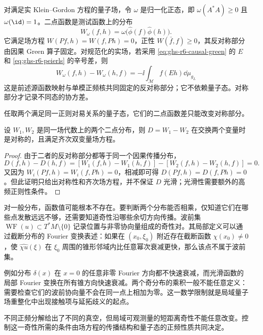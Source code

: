对满足实 Klein--Gordon 方程的量子场，令 $\omega$ 是归一化正态，即 $\omega(A^*A)\ge0$ 且 $\omega(\id)=1$。二点函数是测试函数上的分布
\begin{equation}\label{eq:ghs-r6-two-point-distribution}
W_\omega(f,h)=\omega\bigl(\widehat\phi(f)\widehat\phi(h)\bigr).
\end{equation}
它满足场方程 $W(Pf,h)=W(f,Ph)=0$，正性 $W(\bar f,f)\ge0$，其反对称部分由因果 Green 算子固定。对规范化的实场，若采用 \cref{eq:ghs-r6-causal-green} 的 $E$ 和 \cref{eq:ghs-r6-peierls} 的辛号差，则
\begin{equation}\label{eq:ghs-r6-w-antisymmetric}
W_\omega(f,h)-W_\omega(h,f)=-\ii\int_{\mathcal M}f(Eh)\dd\mu_{g_L}
\end{equation}
这是前述源函数映射与单模正频核共同固定的反对称部分；它不依赖量子态。对称部分才记录不同态的协方差。


任取两个满足同一正则对易关系的量子态，它们的二点函数差只能改变对称部分。

\begin{proposition}[同一场代数上的两点函数差]
设 $W_1,W_2$ 是同一场代数上的两个二点分布，则 $D=W_1-W_2$ 在交换两个变量时是对称的，且满足齐次双变量场方程。
\end{proposition}

\begin{proof}
由于二者的反对称部分都等于同一个因果传播分布，
\[
D(f,h)-D(h,f)=[W_1(f,h)-W_1(h,f)]-[W_2(f,h)-W_2(h,f)]=0.
\]
又因为 $W_i(Pf,h)=W_i(f,Ph)=0$，相减即可得 $D(Pf,h)=D(f,Ph)=0$。但此证明只给出对称性和齐次场方程，并不保证 $D$ 光滑；光滑性需要额外的高频正则性条件。
\end{proof}

对一般分布，函数值可能根本不存在。要判断两个分布能否相乘，仅知道它们在哪些点发散远远不够，还需要知道奇性沿哪些余切方向传播。波前集 $\operatorname{WF}(u)\subset T^*M\setminus\{0\}$ 记录位置与非零协向量组成的奇性对。其局部定义可以通过截断分布的 Fourier 变换表述：如果在 $(x_0,\xi_0)$ 附近存在截断函数 $\chi(x_0)\ne0$，使 $\widehat{\chi u}(\xi)$ 在 $\xi_0$ 周围的锥形邻域内比任意幂次衰减更快，那么该点不属于波前集。

例如分布 $\delta(x)$ 在 $x=0$ 的任意非零 Fourier 方向都不快速衰减，而光滑函数的局部 Fourier 变换在所有锥方向快速衰减。两个奇分布的乘积一般不能任意定义：需要检查它们的波前协向量不会在同一点上相加为零。这一数学限制就是局域量子场重整化中出现接触项与延拓歧义的起点。


不同正频分解给出了不同的真空，但局域可观测量的短距离奇性不能任意改变。控制这一奇性所需的条件由场方程的传播结构和量子态的正频性质共同决定。



